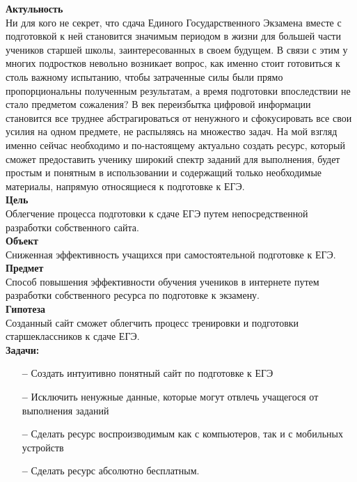 \documentclass[a4paper, 12pt]{extarticle}
\begin{document}
\vspace{2mm}
\textbf{Актульность}
\vspace{2mm}
\\
Ни для кого не секрет, что сдача Единого Государственного Экзамена вместе с
подготовкой к ней становится значимым периодом в жизни для большей части
учеников старшей школы, заинтересованных в своем будущем. В связи с этим у
многих подростков невольно возникает вопрос, как именно стоит готовиться к
столь важному испытанию, чтобы затраченные силы были прямо пропорциональны
полученным результатам, а время подготовки впоследствии не стало предметом
сожаления?  В век переизбытка цифровой информации становится все труднее
абстрагироваться от ненужного и сфокусировать все свои усилия на одном
предмете, не распыляясь на множество задач. На мой взгляд именно сейчас
необходимо и по-настоящему актуально создать ресурс, который сможет
предоставить ученику широкий спектр заданий для выполнения, будет простым и
понятным в использовании и содержащий только необходимые материалы, напрямую относящиеся к подготовке к ЕГЭ.
\\

\vspace{2mm}
\textbf{Цель}
\vspace{2mm}
\\
Облегчение процесса подготовки к сдаче ЕГЭ путем непосредственной разработки собственного сайта.
\\

\vspace{2mm}
\textbf{Объект}
\vspace{2mm}
\\
Сниженная эффективность учащихся при самостоятельной подготовке к ЕГЭ.
\\

\vspace{2mm}
\textbf{Предмет}
\vspace{2mm}
\\
Способ повышения эффективности обучения учеников в интернете
путем разработки собственного ресурса по подготовке к экзамену.
\\

\vspace{2mm}
\textbf{Гипотеза}
\vspace{2mm}
\\
Созданный сайт сможет облегчить процесс тренировки и подготовки
старшеклассников к сдаче ЕГЭ.
\\

\vspace{2mm}
\textbf{Задачи:}
\begin{itemize}
    \item[\bfseries--] Создать интуитивно понятный сайт по подготовке к ЕГЭ
    \item[\bfseries--] Исключить ненужные данные, которые могут отвлечь
        учащегося от выполнения заданий
    \item[\bfseries--] Сделать ресурс воспроизводимым как с компьютеров, так и
        с мобильных устройств
    \item[\bfseries--] Сделать ресурс абсолютно бесплатным.
\end{itemize}
\end{document}
